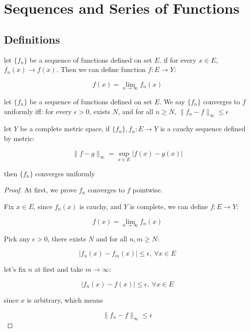 \section{Sequences and Series of Functions}

\subsection{Definitions}

\begin{definition}
    let $\{ f_n \} $ be a sequence of functions defined on set $E$.
    if for every $x \in E$, $f_n(x) \to f(x)$. Then we can define function $f: E \to Y$:

    \[
        f(x) = \lim_{n \to \infty} f_n(x)
    \]
\end{definition}


\begin{definition}
    let $\{ f_n \} $ be a sequence of functions defined on set $E$.
    We say $\{ f_n \}$ converges to $f$ uniformly iff: for every $\epsilon > 0$, exists $N$,
    and for all $n \ge N$, $\| f_n - f \|_{\infty} \le \epsilon $
\end{definition}

\begin{thm}
    \label{thm:uniform-convergence-by-cauchy-sequence}
    let $Y$ be a complete metric space, if $\{ f_n \}, f_n: E \to Y$ is a cauchy sequence defined by metric:

    \[
        \| f - g\|_\infty = \sup_{x \in E} \left|  f(x) - g(x) \right|
    \]

    then $\{ f_n\}$ converges uniformly
\end{thm}

\begin{proof}

    At first, we prove $f_n$ converges to $f$ pointwise.

    Fix $x \in E$, since $f_n(x)$ is cauchy, and $Y$ is complete, we can define $f: E \to Y$:

    \[
        f(x) = \lim_{n \to \infty}f_n(x)
    \]

    Pick any $\epsilon > 0$, there exists $N$ and for all $n,m \ge N$:

    \[
         \left| f_n(x) - f_m(x) \right| \le \epsilon,\: \forall x \in E
    \]

    let's fix $n$ at first and take $m \to \infty$:

    \[
        \left| f_n(x) - f(x) \right| \le \epsilon,\: \forall x \in E
    \]

    since $x$ is arbitrary, which means

    \[
        \| f_n - f \|_\infty \le \epsilon
    \]


\end{proof}

